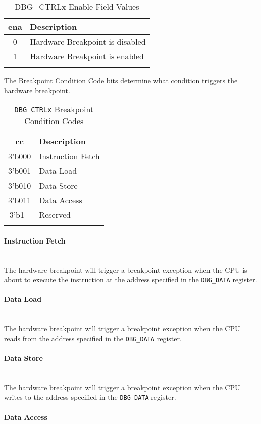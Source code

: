 \begin{longtable}[]{@{}cl@{}}
\toprule
ena & Description\tabularnewline
\midrule
\endhead
0 & Hardware Breakpoint is disabled\tabularnewline
1 & Hardware Breakpoint is enabled\tabularnewline
\bottomrule
\caption{DBG\_CTRLx Enable Field Values}
\end{longtable}


The Breakpoint Condition Code bits determine what condition triggers the
hardware breakpoint.

\begin{longtable}[]{@{}cl@{}}
\toprule
cc & Description\tabularnewline
\midrule
\endhead
3'b000 & Instruction Fetch\tabularnewline
3'b001 & Data Load\tabularnewline
3'b010 & Data Store\tabularnewline
3'b011 & Data Access\tabularnewline
3'b1-\/- & Reserved\tabularnewline
\bottomrule
\caption{\texttt{DBG\_CTRLx} Breakpoint Condition Codes}
\end{longtable} 

\paragraph{Instruction Fetch}\label{instruction-fetch} ~\\

The hardware breakpoint will trigger a breakpoint exception when the CPU
is about to execute the instruction at the address specified in the
\texttt{DBG\_DATA} register.

\paragraph{Data Load}\label{data-load} ~\\

The hardware breakpoint will trigger a breakpoint exception when the CPU
reads from the address specified in the \texttt{DBG\_DATA} register.

\paragraph{Data Store}\label{data-store} ~\\

The hardware breakpoint will trigger a breakpoint exception when the CPU
writes to the address specified in the \texttt{DBG\_DATA} register.

\paragraph{Data Access}\label{data-access} ~\\

